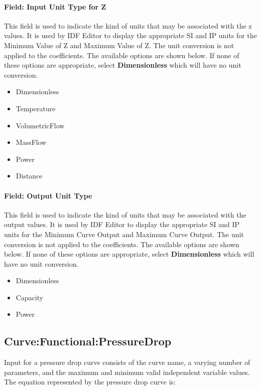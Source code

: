 \paragraph{Field: Input Unit Type for Z}\label{field-input-unit-type-for-z-2}

This field is used to indicate the kind of units that may be associated with the z values. It is used by IDF Editor to display the appropriate SI and IP units for the Minimum Value of Z and Maximum Value of Z. The unit conversion is not applied to the coefficients. The available options are shown below. If none of these options are appropriate, select \textbf{Dimensionless} which will have no unit conversion.

\begin{itemize}
\item
  Dimensionless
\item
  Temperature
\item
  VolumetricFlow
\item
  MassFlow
\item
  Power
\item
  Distance
\end{itemize}

\paragraph{Field: Output Unit Type}\label{field-output-unit-type-10}

This field is used to indicate the kind of units that may be associated with the output values. It is used by IDF Editor to display the appropriate SI and IP units for the Minimum Curve Output and Maximum Curve Output. The unit conversion is not applied to the coefficients. The available options are shown below. If none of these options are appropriate, select \textbf{Dimensionless} which will have no unit conversion.

\begin{itemize}
\item
  Dimensionless
\item
  Capacity
\item
  Power
\end{itemize}

\subsection{Curve:Functional:PressureDrop}\label{curvefunctionalpressuredrop}

Input for a pressure drop curve consists of the curve name, a varying number of parameters, and the maximum and minimum valid independent variable values. The equation represented by the pressure drop curve is:

